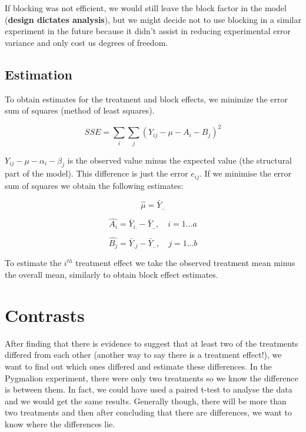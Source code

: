 \documentclass[
  letterpaper,
]{book}
\begin{document}
If blocking was not efficient, we would still leave the block factor in
the model (\textbf{design dictates analysis}), but we might decide not
to use blocking in a similar experiment in the future because it didn't
assist in reducing experimental error variance and only cost us degrees
of freedom.

\section*{Estimation}\label{estimation-1}


To obtain estimates for the treatment and block effects, we minimize the
error sum of squares (method of least squares).

\[
SSE = \sum_i \sum_j (Y_{ij} - \mu - A_i - B_j)^2
\]

\(Y_{ij} - \mu - \alpha_i - \beta_j\) is the observed value minus the
expected value (the structural part of the model). This difference is
just the error \(e_{ij}\). If we minimise the error sum of squares we
obtain the following estimates:

\[
\hat{\mu} = \bar{Y}_{..}
\]

\[
\hat{A_i} = \bar{Y}_{i.} - \bar{Y}_{..}, \quad i = 1 \dots a
\]

\[
\hat{B_j} = \bar{Y}_{.j} - \bar{Y}_{..}, \quad j = 1 \dots b
\]

To estimate the \(i^{th}\) treatment effect we take the observed
treatment mean minus the overall mean, similarly to obtain block effect
estimates.

\chapter{Contrasts}\label{contrasts-1}

After finding that there is evidence to suggest that at least two of the
treatments differed from each other (another way to say there is a
treatment effect!), we want to find out which ones differed and estimate
these differences. In the Pygmalion experiment, there were only two
treatments so we know the difference is between them. In fact, we could
have used a paired t-test to analyse the data and we would get the same
results. Generally though, there will be more than two treatments and
then after concluding that there are differences, we want to know where
the differences lie.

\end{document}

